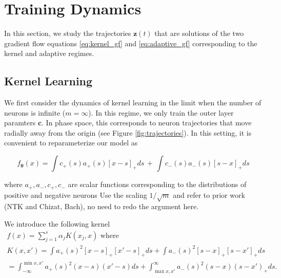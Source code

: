 \section{Training Dynamics}

In this section, we study the trajectories $\bm z(t)$ that are solutions of the two gradient flow equations \eqref{eq:kernel_gf} and \eqref{eq:adaptive_gf} corresponding to the kernel and adaptive regimes. 


\subsection{Kernel Learning}


We first consider the dynamics of kernel learning in the limit when the number of neurons is infinite ($m = \infty$). In this regime, we only train the outer layer paramters $\bm c$. In phase space, this corresponds to neuron trajectories that move radially away from the origin (see Figure \ref{fig:trajectories}). In this setting, it is convenient to reparameterize our model as

\begin{equation}\label{eq:infinite_model}
    f_{\bm \theta}(x) = \int c_+(s) a_+(s)[x-s]_+ ds \, + \,  \int c_-(s) a_-(s)[s-x]_+ ds
\end{equation}

where $a_+, a_-, c_+, c_-$ are scalar functions corresponding to the distributions of positive and negative neurons 
Use the scaling $1/\sqrt{m}$ and refer to prior work (NTK and Chizat, Bach), no need to redo the argument here. 

We introduce the following kernel
\begin{equation}
\begin{gathered}
    f(x) = \sum_{j=1}^s \alpha_j K(x_j, x) \text{ where } \\
    K(x, x') = \int a_+(s)^2[x - s]_+ [x' - s]_+ ds + \int a_-(s)^2[s - x]_+ [s - x']_+ ds\\
    = \int_{-\infty}^{\min x, x'} a_+(s)^2 (x - s)(x' - s) ds + \int_{\max x, x'}^\infty a_-(s)^2(s - x) (s - x')_+ ds.
\end{gathered}
\end{equation}

